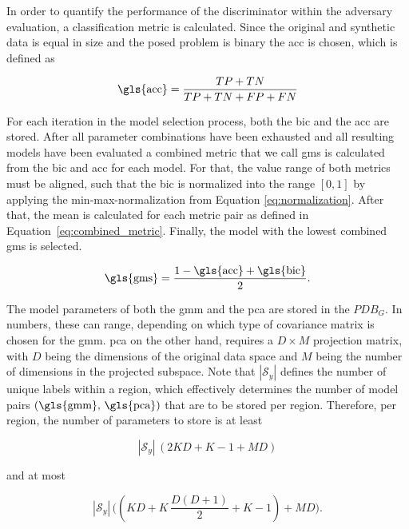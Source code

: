 \documentclass[../../main.tex]{subfiles}
\begin{document}
In order to quantify the performance of the discriminator within the adversary evaluation, a classification metric is calculated. Since the original and synthetic data is equal in size and the posed problem is binary the \acrfull{acc} is chosen, which is defined as

 \begin{equation}
    \text{\gls{acc}} = \frac{TP + TN}{TP + TN + FP + FN}
 \end{equation}

 For each iteration in the model selection process, both the \gls{bic} and the \gls{acc} are stored. After all parameter combinations have been exhausted and all resulting models have been evaluated a combined metric that we call  \acrfull{gms} is calculated from the \gls{bic} and \gls{acc} for each model. For that, the value range of both metrics must be aligned, such that the \gls{bic} is normalized into the range $[0, 1]$ by applying the min-max-normalization from Equation \ref{eq:normalization}. After that, the mean is calculated for each metric pair as defined in Equation~\ref{eq:combined_metric}. Finally, the model with the lowest combined \gls{gms} is selected. 
 
 \begin{equation}\label{eq:combined_metric}
    \text{\gls{gms}} = \frac{1 - \text{\gls{acc}} + \text{\gls{bic}}}{2}.
 \end{equation}
 
 The model parameters of both the \gls{gmm} and the \gls{pca} are stored in the $PDB_G$. In numbers, these can range, depending on which type of covariance matrix is chosen for the \gls{gmm}. \Acrshort{pca} on the other hand, requires a $D \times M$ projection matrix, with $D$ being the dimensions of the original data space and $M$ being the number of dimensions in the projected subspace. Note that $|\mathcal{S}_y|$ defines the number of unique labels within a region, which effectively determines the number of model pairs $(\text{\gls{gmm}, \gls{pca}})$ that are to be stored per region. Therefore, per region, the number of parameters to store is at least
 
 \begin{equation*}
    |\mathcal{S}_y| \, ( 2KD +K-1 + MD  )
 \end{equation*}

 and at most

 \begin{equation*}
    |\mathcal{S}_y| \, \bigl( (KD + K \, \frac{D(D+1)}{2}+K-1) + MD \bigr).
 \end{equation*}

\end{document}
